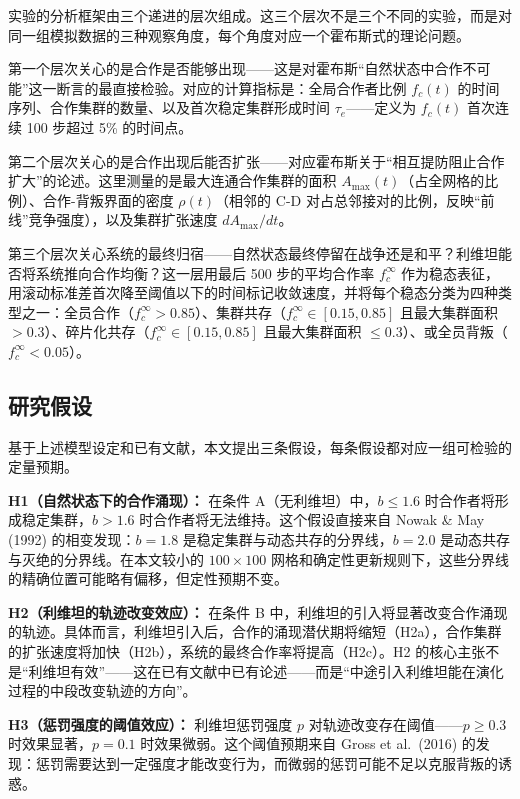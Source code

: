 \documentclass[12pt,a4paper]{ctexart}
\begin{document}
实验的分析框架由三个递进的层次组成。这三个层次不是三个不同的实验，而是对同一组模拟数据的三种观察角度，每个角度对应一个霍布斯式的理论问题。

第一个层次关心的是合作是否能够出现——这是对霍布斯“自然状态中合作不可能”这一断言的最直接检验。对应的计算指标是：全局合作者比例 $f_c(t)$ 的时间序列、合作集群的数量、以及首次稳定集群形成时间 $\tau_e$——定义为 $f_c(t)$ 首次连续 100 步超过 5\% 的时间点。

第二个层次关心的是合作出现后能否扩张——对应霍布斯关于“相互提防阻止合作扩大”的论述。这里测量的是最大连通合作集群的面积 $A_{\max}(t)$（占全网格的比例）、合作-背叛界面的密度 $\rho(t)$（相邻的 C-D 对占总邻接对的比例，反映“前线”竞争强度），以及集群扩张速度 $dA_{\max}/dt$。

第三个层次关心系统的最终归宿——自然状态最终停留在战争还是和平？利维坦能否将系统推向合作均衡？这一层用最后 500 步的平均合作率 $f_c^\infty$ 作为稳态表征，用滚动标准差首次降至阈值以下的时间标记收敛速度，并将每个稳态分类为四种类型之一：全员合作（$f_c^\infty > 0.85$）、集群共存（$f_c^\infty \in [0.15, 0.85]$ 且最大集群面积 $>0.3$）、碎片化共存（$f_c^\infty \in [0.15, 0.85]$ 且最大集群面积 $\le 0.3$）、或全员背叛（$f_c^\infty < 0.05$）。

\subsection{研究假设}

基于上述模型设定和已有文献，本文提出三条假设，每条假设都对应一组可检验的定量预期。

\textbf{H1（自然状态下的合作涌现）：} 在条件 A（无利维坦）中，$b \le 1.6$ 时合作者将形成稳定集群，$b > 1.6$ 时合作者将无法维持。这个假设直接来自 Nowak \& May (1992) 的相变发现：$b=1.8$ 是稳定集群与动态共存的分界线，$b=2.0$ 是动态共存与灭绝的分界线。在本文较小的 $100 \times 100$ 网格和确定性更新规则下，这些分界线的精确位置可能略有偏移，但定性预期不变。

\textbf{H2（利维坦的轨迹改变效应）：} 在条件 B 中，利维坦的引入将显著改变合作涌现的轨迹。具体而言，利维坦引入后，合作的涌现潜伏期将缩短（H2a），合作集群的扩张速度将加快（H2b），系统的最终合作率将提高（H2c）。H2 的核心主张不是“利维坦有效”——这在已有文献中已有论述——而是“中途引入利维坦能在演化过程的中段改变轨迹的方向”。

\textbf{H3（惩罚强度的阈值效应）：} 利维坦惩罚强度 $p$ 对轨迹改变存在阈值——$p \ge 0.3$ 时效果显著，$p = 0.1$ 时效果微弱。这个阈值预期来自 Gross et al.\ (2016) 的发现：惩罚需要达到一定强度才能改变行为，而微弱的惩罚可能不足以克服背叛的诱惑。
\end{document}
